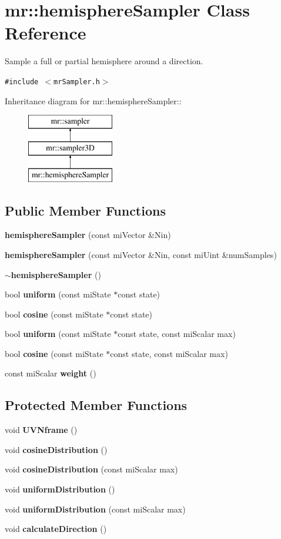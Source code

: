 \section{mr::hemisphere\-Sampler Class Reference}
\label{classmr_1_1hemisphereSampler}
Sample a full or partial hemisphere around a direction.  


{\tt \#include $<$mr\-Sampler.h$>$}

Inheritance diagram for mr::hemisphere\-Sampler::\begin{figure}[H]
\begin{center}
\leavevmode
\includegraphics[height=3cm]{classmr_1_1hemisphereSampler}
\end{center}
\end{figure}
\subsection*{Public Member Functions}
\begin{CompactItemize}
\item 
{\bf hemisphere\-Sampler} (const mi\-Vector \&Nin)
\item 
{\bf hemisphere\-Sampler} (const mi\-Vector \&Nin, const mi\-Uint \&num\-Samples)
\item 
{\bf $\sim$hemisphere\-Sampler} ()
\item 
bool {\bf uniform} (const mi\-State $\ast$const state)
\item 
bool {\bf cosine} (const mi\-State $\ast$const state)
\item 
bool {\bf uniform} (const mi\-State $\ast$const state, const mi\-Scalar max)
\item 
bool {\bf cosine} (const mi\-State $\ast$const state, const mi\-Scalar max)
\item 
const mi\-Scalar {\bf weight} ()
\end{CompactItemize}
\subsection*{Protected Member Functions}
\begin{CompactItemize}
\item 
void {\bf UVNframe} ()
\item 
void {\bf cosine\-Distribution} ()
\item 
void {\bf cosine\-Distribution} (const mi\-Scalar max)
\item 
void {\bf uniform\-Distribution} ()
\item 
void {\bf uniform\-Distribution} (const mi\-Scalar max)
\item 
void {\bf calculate\-Direction} ()
\end{CompactItemize}


